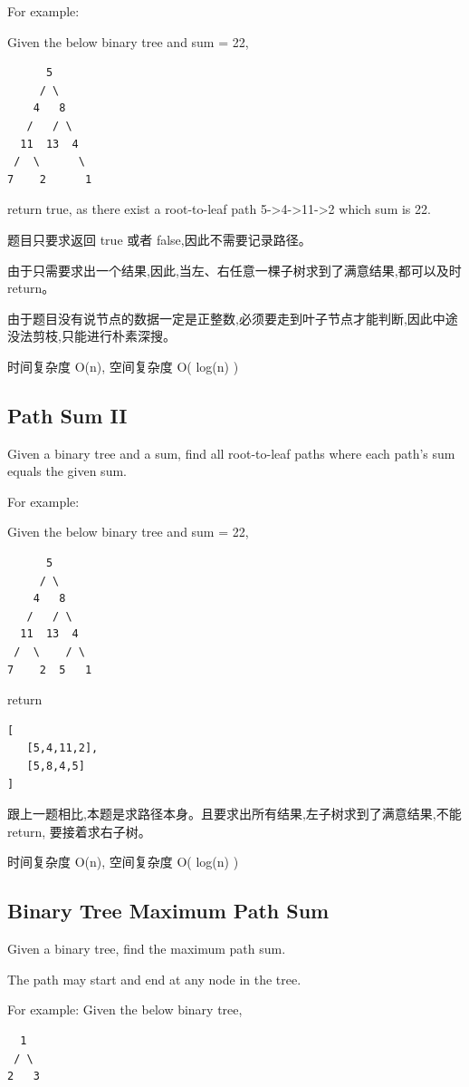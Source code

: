 \documentclass[12pt]{book}
\begin{document}
For example:

Given the below binary tree and sum = 22,
\lstset{language=java,label= ,caption= ,numbers=none}
\begin{lstlisting}
      5
     / \
    4   8
   /   / \
  11  13  4
 /  \      \
7    2      1
\end{lstlisting}

return true, as there exist a root-to-leaf path 5->4->11->2 which sum is 22.

题目只要求返回 true 或者 false,因此不需要记录路径。

由于只需要求出一个结果,因此,当左、右任意一棵子树求到了满意结果,都可以及时 return。

由于题目没有说节点的数据一定是正整数,必须要走到叶子节点才能判断,因此中途没法剪枝,只能进行朴素深搜。

时间复杂度 O(n), 空间复杂度 O( log(n) )

\subsection{Path Sum II}
\label{sec-4-5-4}
Given a binary tree and a sum, find all root-to-leaf paths where each path's sum equals the given sum.

For example:

Given the below binary tree and sum = 22,
\lstset{language=java,label= ,caption= ,numbers=none}
\begin{lstlisting}
      5
     / \
    4   8
   /   / \
  11  13  4
 /  \    / \
7    2  5   1
\end{lstlisting}

return
\lstset{language=java,label= ,caption= ,numbers=none}
\begin{lstlisting}
[
   [5,4,11,2],
   [5,8,4,5]
]
\end{lstlisting}

跟上一题相比,本题是求路径本身。且要求出所有结果,左子树求到了满意结果,不能 return, 要接着求右子树。

时间复杂度 O(n), 空间复杂度 O( log(n) )

\subsection{Binary Tree Maximum Path Sum}
\label{sec-4-5-5}
Given a binary tree, find the maximum path sum.

The path may start and end at any node in the tree.

For example:
Given the below binary tree,
\lstset{language=java,label= ,caption= ,numbers=none}
\begin{lstlisting}
  1
 / \
2   3
\end{lstlisting}
\end{document}
